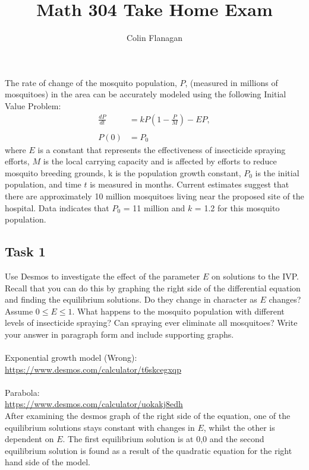 \documentclass[12pt]{article}
\title{Math 304 Take Home Exam}
\author{Colin Flanagan}
\begin{document}
\maketitle

\vspace{0.5in}
The rate of change of the mosquito population, $P$, (measured in millions of mosquitoes) in the area can be accurately modeled using the following Initial Value Problem:
\begin{align*}
    \frac{dP}{dt} &= kP(1-\frac{P}{M})-EP,\\
    \\
    P(0) &= P_0
\end{align*}
where $E$ is a constant that represents the effectiveness of insecticide spraying efforts, $M$ is
the local carrying capacity and is affected by efforts to reduce mosquito breeding
grounds, k is the population growth constant, $P_0$ is the initial population, and time $t$ is
measured in months. Current estimates suggest that there are approximately 10 million
mosquitoes living near the proposed site of the hospital. Data indicates that $P_0$ = 11 million
and $k$ = 1.2 for this mosquito population.\\

\subsection*{Task 1}
Use Desmos to investigate the effect of the parameter $E$ on solutions to the IVP. Recall that you can do this by graphing the right side of the differential equation and finding the
equilibrium solutions. Do they change in character as $E$ changes? Assume $0 \leq E \leq 1$. What happens to the mosquito population with different levels of insecticide spraying? Can spraying ever eliminate all mosquitoes? Write your answer in paragraph form and
include supporting graphs. \\
\\
Exponential growth model (Wrong):\\
\href{Desmos: }{https://www.desmos.com/calculator/t6skcegxqp}\\
\\
Parabola:\\
\href{Desmos: }{https://www.desmos.com/calculator/uokakj8edh}\\
After examining the desmos graph of the right side of the equation, one of the equilibrium solutions stays constant with changes in $E$, whilst the other is dependent on $E$. The first equilibrium solution is at 0,0 and the second equilibrium solution is found as a result of the quadratic equation for the right hand side of the model.
\end{document}
